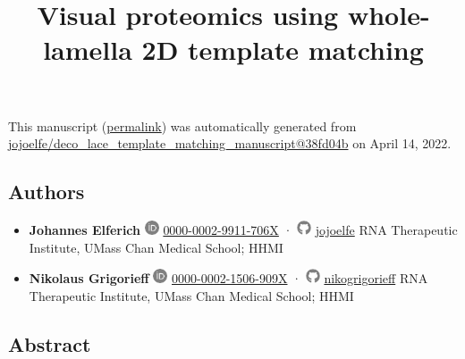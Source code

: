 \documentclass[
]{article}
\title{Visual proteomics using whole-lamella 2D template matching}
\author{}
\date{}
\begin{document}
\maketitle

This manuscript
(\href{https://jojoelfe.github.io/deco_lace_template_matching_manuscript/v/38fd04bb92cfffb0ea0e0e112da741a0da4b716a/}{permalink})
was automatically generated
from \href{https://github.com/jojoelfe/deco_lace_template_matching_manuscript/tree/38fd04bb92cfffb0ea0e0e112da741a0da4b716a}{jojoelfe/deco\_lace\_template\_matching\_manuscript@38fd04b}
on April 14, 2022.

\hypertarget{authors}{%
\subsection{Authors}\label{authors}}

\begin{itemize}
\item
  \textbf{Johannes Elferich}
  \includegraphics[width=0.16667in,height=0.16667in]{images/orcid.pdf}
  \href{https://orcid.org/0000-0002-9911-706X}{0000-0002-9911-706X}
  · \includegraphics[width=0.16667in,height=0.16667in]{images/github.pdf}
  \href{https://github.com/jojoelfe}{jojoelfe}
  RNA Therapeutic Institute, UMass Chan Medical School; HHMI
\item
  \textbf{Nikolaus Grigorieff}
  \includegraphics[width=0.16667in,height=0.16667in]{images/orcid.pdf}
  \href{https://orcid.org/0000-0002-1506-909X}{0000-0002-1506-909X}
  · \includegraphics[width=0.16667in,height=0.16667in]{images/github.pdf}
  \href{https://github.com/nikogrigorieff}{nikogrigorieff}
  RNA Therapeutic Institute, UMass Chan Medical School; HHMI
\end{itemize}

\hypertarget{abstract}{%
\subsection{Abstract}\label{abstract}}
\end{document}
